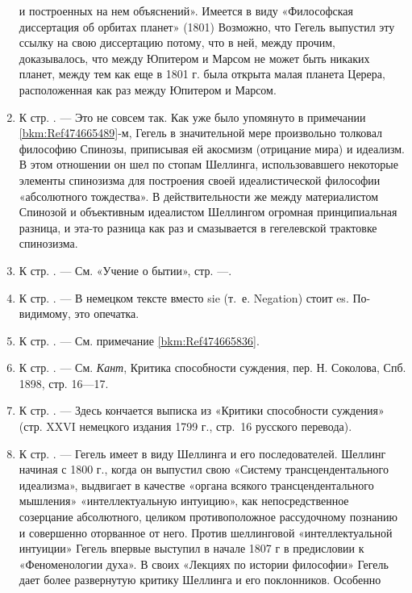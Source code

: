 \begin{enumerate}
и построенных на нем объяснений». Имеется в виду «Философская диссертация
об орбитах планет» (1801) Возможно, что Гегель выпустил эту ссылку на свою
диссертацию потому, что в ней, между прочим, доказывалось, что между
Юпитером и Марсом не может быть никаких планет, между тем как еще в 1801 г.
была открыта малая планета Церера, расположенная как раз между Юпитером и
Марсом.
\item \label{bkm:Ref474666782}К стр. \pageref{bkm:bm72}. — Это не совсем
так. Как уже было упомянуто в примечании \ref{bkm:Ref474665489}{}-м, Гегель
в значительной мере произвольно толковал философию Спинозы, приписывая ей
акосмизм (отрицание мира) и идеализм. В этом отношении он шел по стопам
Шеллинга, использовавшего некоторые элементы спинозизма для построения
своей идеалистической философии «абсолютного тождества». В действительности
же между материалистом Спинозой и объективным идеалистом Шеллингом огромная
принципиальная разница, и эта-то разница как раз и смазывается в
гегелевской трактовке спинозизма.
\item \label{bkm:Ref474666794}К стр. \pageref{bkm:bm73}. — См. «Учение о
бытии», стр. \pageref{bkm:bm73a}—\pageref{bkm:bm73b}.
\item \label{bkm:Ref474666798}К стр. \pageref{bkm:bm74}. — В немецком тексте
вместо sie (т.~е. Negation) стоит es. По-видимому, это опечатка.
\item \label{bkm:Ref474666813}К стр. \pageref{bkm:bm75}. — См. примечание
\ref{bkm:Ref474665836}.
\item \label{bkm:Ref474666829}К стр. \pageref{bkm:bm76}. — См.
{\em Кант}, Критика способности суждения, пер. Н. Соколова, Спб. 1898,
стр. 16—17.
\item \label{bkm:Ref474666833}К стр. \pageref{bkm:bm77}. — Здесь кончается
выписка из «Критики способности суждения» (стр. XXVI немецкого издания 1799
г., стр.~16 русского перевода).
\item \label{bkm:Ref474666843}К стр. \pageref{bkm:bm78}. — Гегель имеет в
виду Шеллинга и его последователей. Шеллинг начиная с 1800 г., когда он
выпустил свою «Систему трансцендентального идеализма», выдвигает в качестве
«органа всякого трансцендентального мышления» «интеллектуальную интуицию»,
как непосредственное созерцание абсолютного, целиком противоположное
рассудочному познанию и совершенно оторванное от него. Против шеллинговой
«интеллектуальной интуиции» Гегель впервые выступил в начале 1807 г в
предисловии к «Феноменологии духа». В своих «Лекциях по истории философии»
Гегель дает более развернутую критику Шеллинга и его поклонников. Особенно

\end{enumerate}

